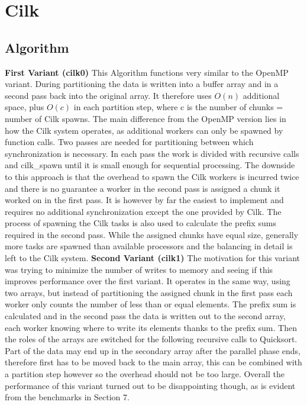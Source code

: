 \documentclass[12pt,a4paper]{article}
\begin{document}
\section{Cilk}
\subsection{Algorithm}
\textbf{First Variant (cilk0)}\newline
This Algorithm functions very similar to the OpenMP variant. During partitioning the data is written into a buffer array and in a second pass back into the original array. It therefore uses $O(n)$ additional space, plus $O(c)$ in each partition step, where c is the number of chunks = number of Cilk spawns. 
The main difference from the OpenMP version lies in how the Cilk system operates, as additional workers can only be spawned by function calls. Two passes are needed for partitioning between which synchronization is necessary. In each pass the work is divided with recursive calls and cilk\_spawn until it is small enough for sequential processing. The downside to this approach is that the overhead to spawn the Cilk workers is incurred twice and there is no guarantee a worker in the second pass is assigned a chunk it worked on in the first pass. It is however by far the easiest to implement and requires no additional synchronization except the one provided by Cilk. The process of spawning the Cilk tasks is also used to calculate the prefix sums required in the second pass. While the assigned chunks have equal size, generally more tasks are spawned than available processors and the balancing in detail is left to the Cilk system.
\newline\newline
\textbf{Second Variant (cilk1)}\newline
The motivation for this variant was trying to minimize the number of writes to memory and seeing if this improves performance over the first variant. It operates in the same way, using two arrays, but instead of partitioning the assigned chunk in the first pass each worker only counts the number of less than or equal elements. The prefix sum is calculated and in the second pass the data is written out to the second array, each worker knowing where to write its elements thanks to the prefix sum. 
Then the roles of the arrays are switched for the following recursive calls to Quicksort. Part of the data may end up in the secondary array after the parallel phase ends, therefore first has to be moved back to the main array, this can be combined with a partition step however so the overhead should not be too large. Overall the performance of this variant turned out to be disappointing though, as is evident from the benchmarks in Section 7.
\end{document}
